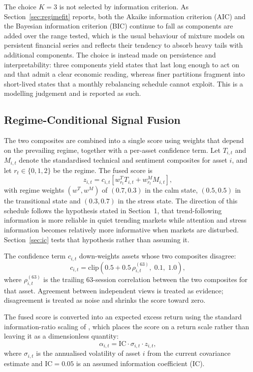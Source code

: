 \documentclass{singlecol-new}
\theoremstyle{TH}{
\newtheorem{lemma}{Lemma}
\newtheorem{theorem}[lemma]{Theorem}
\newtheorem{corrolary}[lemma]{Corrolary}
\newtheorem{conjecture}[lemma]{Conjecture}
\newtheorem{proposition}[lemma]{Proposition}
\newtheorem{claim}[lemma]{Claim}
\newtheorem{stheorem}[lemma]{Wrong Theorem}
\newtheorem{algorithm}{Algorithm}
}
\theoremstyle{THrm}{
\newtheorem{definition}{Definition}[section]
\newtheorem{question}{Question}[section]
\newtheorem{remark}{Remark}
\newtheorem{scheme}{Scheme}
}
\theoremstyle{THhit}{
\newtheorem{case}{Case}[section]
}
\begin{document}
The choice $K = 3$ is not selected by information criterion. As
Section~\ref{sec:regimefit} reports, both the Akaike information criterion (AIC)
and the Bayesian information criterion (BIC) continue to fall as components are added
over the range tested, which is the usual behaviour of mixture models on
persistent financial series and reflects their tendency to absorb heavy tails with
additional components. The choice is instead made on persistence and interpretability:
three components yield states that last long enough to act on and that admit a clear
economic reading, whereas finer partitions fragment into short-lived states that a
monthly rebalancing schedule cannot exploit. This is a modelling judgement and is
reported as such.

\subsection{Regime-Conditional Signal Fusion}

The two composites are combined into a single score using weights that depend on the
prevailing regime, together with a per-asset confidence term. Let $T_{i,t}$ and
$M_{i,t}$ denote the standardised technical and sentiment composites for asset $i$,
and let $r_t \in \{0,1,2\}$ be the regime. The fused score is
\begin{equation}
z_{i,t} = c_{i,t} \left[ w^{T}_{r_t} T_{i,t} + w^{M}_{r_t} M_{i,t} \right],
\end{equation}
with regime weights $(w^T, w^M)$ of $(0.7, 0.3)$ in the calm state, $(0.5, 0.5)$ in the
transitional state and $(0.3, 0.7)$ in the stress state. The direction of this schedule
follows the hypothesis stated in Section~1, that trend-following information is more
reliable in quiet trending markets while attention and stress information becomes
relatively more informative when markets are disturbed. Section~\ref{sec:ic} tests that
hypothesis rather than assuming it.

The confidence term $c_{i,t}$ down-weights assets whose two composites disagree:
\begin{equation}
c_{i,t} = \mathrm{clip}\!\left(0.5 + 0.5\,\rho^{(63)}_{i,t}, \; 0.1, \; 1.0\right),
\end{equation}
where $\rho^{(63)}_{i,t}$ is the trailing 63-session correlation between the two
composites for that asset. Agreement between independent views is treated as evidence;
disagreement is treated as noise and shrinks the score toward zero.

The fused score is converted into an expected excess return using the standard
information-ratio scaling of \citet{grinold00}, which places the score on a return
scale rather than leaving it as a dimensionless quantity:
\begin{equation}
\alpha_{i,t} = \mathrm{IC} \cdot \sigma_{i,t} \cdot z_{i,t},
\label{eq:alpha}
\end{equation}
where $\sigma_{i,t}$ is the annualised volatility of asset $i$ from the current
covariance estimate and $\mathrm{IC} = 0.05$ is an assumed information coefficient (IC).
\end{document}

